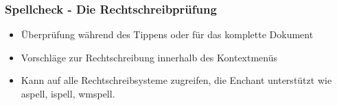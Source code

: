 \begin{frame}
  \frametitle{Spellcheck - Die Rechtschreibprüfung}
  \begin{block}{}
    \begin{itemize}
    \item Überprüfung während des Tippens oder für das komplette
      Dokument
    \item Vorschläge zur Rechtschreibung innerhalb des Kontextmenüs
    \item Kann auf alle Rechtschreibsysteme zugreifen, die Enchant
      unterstützt wie aspell, ispell, wmspell.
    \end{itemize}
  \end{block}
\end{frame}
